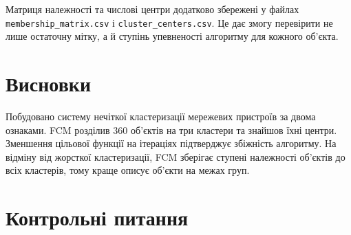 \documentclass[12pt,a4paper]{article}
\begin{document}
Матриця належності та числові центри додатково збережені у файлах \texttt{membership\_matrix.csv} і \texttt{cluster\_centers.csv}. Це дає змогу перевірити не лише остаточну мітку, а й ступінь упевненості алгоритму для кожного об'єкта.

\section{Висновки}
Побудовано систему нечіткої кластеризації мережевих пристроїв за двома ознаками. FCM розділив 360 об'єктів на три кластери та знайшов їхні центри. Зменшення цільової функції на ітераціях підтверджує збіжність алгоритму. На відміну від жорсткої кластеризації, FCM зберігає ступені належності об'єктів до всіх кластерів, тому краще описує об'єкти на межах груп.

\section{Контрольні питання}
\end{document}
